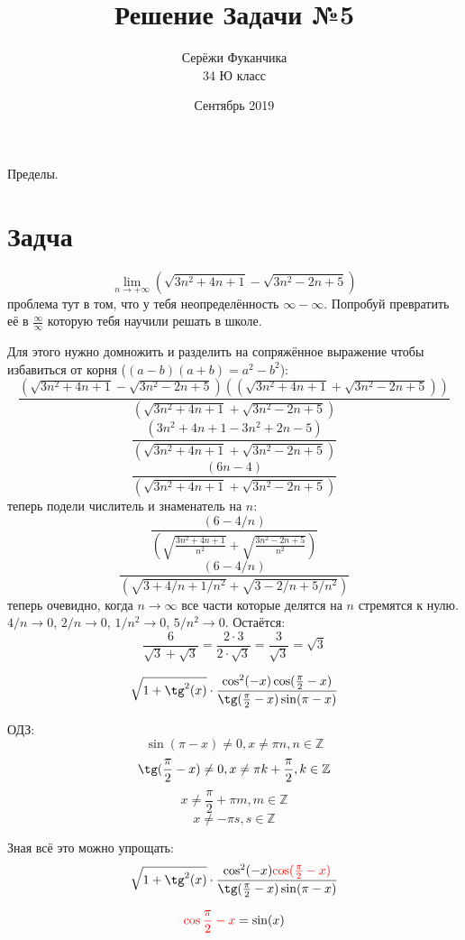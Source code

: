 \documentclass{article}
\title{Решение Задачи №5}
\author{Серёжи Фуканчика\\34 Ю класс}
\date{Сентябрь 2019}
\begin{document}
\maketitle

Пределы.
\section{Задча}
$$\lim_{n\to+\infty}{(\sqrt{3n^2+4n+1}-\sqrt{3n^2-2n+5})}$$
проблема тут в том, что у тебя неопределённость $\infty-\infty$. Попробуй превратить её в $\frac{\infty}{\infty}$ которую тебя научили решать в школе.

Для этого нужно домножить и разделить на сопряжённое выражение чтобы избавиться от корня ($(a-b)(a+b)=a^2-b^2$):
$$\frac{(\sqrt{3n^2+4n+1}-\sqrt{3n^2-2n+5})((\sqrt{3n^2+4n+1}+\sqrt{3n^2-2n+5}))}{(\sqrt{3n^2+4n+1}+\sqrt{3n^2-2n+5})}$$
$$\frac{(3n^2+4n+1-3n^2+2n-5)}{(\sqrt{3n^2+4n+1}+\sqrt{3n^2-2n+5})}$$
$$\frac{(6n-4)}{(\sqrt{3n^2+4n+1}+\sqrt{3n^2-2n+5})}$$
теперь подели числитель и знаменатель на $n$:
$$\frac{(6-4/n)}{(\sqrt{\frac{3n^2+4n+1}{n^2}}+\sqrt{\frac{3n^2-2n+5}{n^2}})}$$
$$\frac{(6-4/n)}{(\sqrt{3+4/n+1/{n^2}}+\sqrt{3-2/n+5/{n^2}})}$$
теперь очевидно, когда $n\to\infty$ все части которые делятся на $n$ стремятся к нулю. $4/n\to{}0$, $2/n\to{}0$, $1/{n^2}\to0$, $5/{n^2}\to{}0$.
Остаётся:
$$\frac{6}{\sqrt{3}+\sqrt{3}}=\frac{2\cdot{}3}{2\cdot\sqrt{3}}=\frac{3}{\sqrt{3}}=\sqrt{3}$$

\newpage
$$\sqrt{1+\tg^2(x)}\cdot\frac{\cos^2(-x)\cos(\frac{\pi}{2}-x)}{\tg(\frac{\pi}{2}-x)\sin(\pi-x)}$$

ОДЗ:
$$\sin(\pi-x) \ne 0, x \ne \pi{}n, n\in{}\mathbb{Z}$$ $$\tg(\frac{\pi}{2}-x) \ne 0, x\ne\pi{}k+\frac{\pi}{2}, k\in{}\mathbb{Z}$$
$$x\ne\frac{\pi}{2}+\pi{}m, m\in{}\mathbb{Z}$$
$$x\ne-\pi{}s, s\in{}\mathbb{Z}$$

Зная всё это можно упрощать:
$$\sqrt{1+\tg^2(x)}\cdot\frac{\cos^2(-x){\color{red}\cos(\frac{\pi}{2}-x)}}{\tg(\frac{\pi}{2}-x)\sin(\pi-x)}$$

$${\color{red}\cos{\frac{\pi}{2}-x}}=\sin(x)$$
\end{document}
